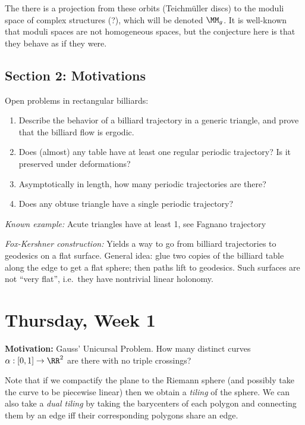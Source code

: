 The there is a projection from these orbits (Teichmüller discs) to the
moduli space of complex structures (?), which will be denoted \(\MM_g\).
It is well-known that moduli spaces are not homogeneous spaces, but the
conjecture here is that they behave as if they were.

\hypertarget{section-2-motivations}{%
\subsection{Section 2: Motivations}\label{section-2-motivations}}

Open problems in rectangular billiards:

\begin{enumerate}
\def\labelenumi{\arabic{enumi}.}
\tightlist
\item
  Describe the behavior of a billiard trajectory in a generic triangle,
  and prove that the billiard flow is ergodic.
\item
  Does (almost) any table have at least one regular periodic trajectory?
  Is it preserved under deformations?
\item
  Asymptotically in length, how many periodic trajectories are there?
\item
  Does any obtuse triangle have a single periodic trajectory?
\end{enumerate}

\emph{Known example:} Acute triangles have at least 1, see Fagnano
trajectory

\emph{Fox-Kershner construction:} Yields a way to go from billiard
trajectories to geodesics on a flat surface. General idea: glue two
copies of the billiard table along the edge to get a flat sphere; then
paths lift to geodesics. Such surfaces are not ``very flat'', i.e.~they
have nontrivial linear holonomy.

\hypertarget{thursday-week-1}{%
\section{Thursday, Week 1}\label{thursday-week-1}}

\textbf{Motivation:} Gauss' Unicursal Problem. How many distinct curves
\(\alpha: [0, 1] \to \RR^2\) are there with no triple crossings?

Note that if we compactify the plane to the Riemann sphere (and possibly
take the curve to be piecewise linear) then we obtain a \emph{tiling} of
the sphere. We can also take a \emph{dual tiling} by taking the
barycenters of each polygon and connecting them by an edge iff their
corresponding polygons share an edge.

